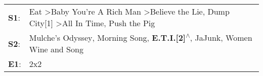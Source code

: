 \begin{supertabular}{p{0.03\textwidth}p{0.92\textwidth}}
 \textbf{S1}:  &  Eat\textsuperscript{} \textgreater \enspace Baby You're A Rich Man\textsuperscript{} \textgreater \enspace Believe the Lie\textsuperscript{}, \enspace Dump City[1]\textsuperscript{} \textgreater \enspace All In Time\textsuperscript{}, \enspace Push the Pig\textsuperscript{}  \enspace  \\
 \textbf{S2}:  &                                                               Mulche's Odyssey\textsuperscript{}, \enspace Morning Song\textsuperscript{}, \enspace \textbf{E.T.I.[2]\textsuperscript{$\wedge$}}, \enspace JaJunk\textsuperscript{}, \enspace Women Wine and Song\textsuperscript{}  \enspace  \\
 \textbf{E1}:  &                                                                                                                                                                                                                                                               2x2\textsuperscript{}  \enspace  \\
\end{supertabular}

